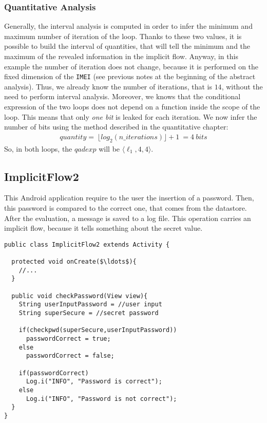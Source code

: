 \documentclass{llncs}
\begin{document}
\subsubsection{Quantitative Analysis}
Generally, the interval analysis is computed in order to infer the minimum and maximum number of iteration of the loop. Thanks to these two values, it is possible to build the interval of quantities, that will tell the minimum and the maximum of the revealed information in the implicit flow. Anyway, in this example the number of iteration does not change, because it is performed on the fixed dimension of the \texttt{IMEI} (see previous notes at the beginning of the abstract analysis). Thus, we already know the number of iterations, that is $14$, without the need to perform interval analysis. Moreover, we knows that the conditional expression of the two loops does not depend on a function inside the scope of the loop. This means that only \emph{one bit} is leaked for each iteration. We now infer the number of bits using the method described in the quantitative chapter:
\begin{align*}
quantity =\ \lfloor log_2(n\_iterations)\rfloor + 1\ = 4\ bits 
\end{align*}
So, in both loops, the $qadexp$ will be $\langle \ell_1, 4, 4 \rangle$.
 

\subsection{ImplicitFlow2}
This Android application require to the user the insertion of a password. Then, this password is compared to the correct one, that comes from the datastore. After the evaluation, a message is saved to a log file. This operation carries an implicit flow, because it tells something about the secret value.

\begin{center}
\begin{lstlisting}[basicstyle=\sffamily\scriptsize]
public class ImplicitFlow2 extends Activity {
	
  protected void onCreate($\ldots$){
    //...
  }
	
  public void checkPassword(View view){
    String userInputPassword = //user input
    String superSecure = //secret password
		
    if(checkpwd(superSecure,userInputPassword))
      passwordCorrect = true;
    else
      passwordCorrect = false;
		
    if(passwordCorrect)
      Log.i("INFO", "Password is correct");
    else
      Log.i("INFO", "Password is not correct");
  }
}
\end{lstlisting}
\end{center}
\end{document}
